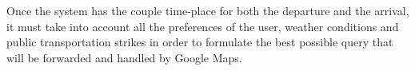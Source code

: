 Once the system has the couple time-place for both the departure and the arrival, it must take into account all the preferences of the user, weather conditions and public transportation strikes in order to formulate the best possible query that will be forwarded and handled by Google Maps.